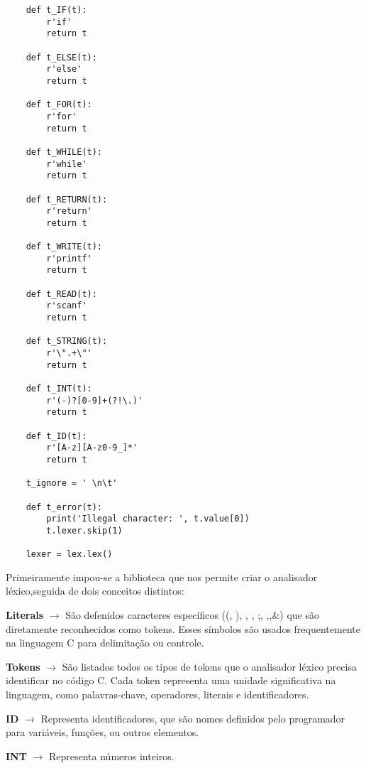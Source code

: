 \documentclass[12pt,a4paper]{report}
\begin{document}
\begin{lstlisting}
    def t_IF(t):
        r'if'
        return t
    
    def t_ELSE(t):
        r'else'
        return t
    
    def t_FOR(t):
        r'for'
        return t
    
    def t_WHILE(t):
        r'while'
        return t
    
    def t_RETURN(t):
        r'return'
        return t
    
    def t_WRITE(t):
        r'printf'
        return t
    
    def t_READ(t):
        r'scanf'
        return t
    
    def t_STRING(t):
        r'\".+\"'
        return t
    
    def t_INT(t):
        r'(-)?[0-9]+(?!\.)'
        return t
    
    def t_ID(t):
        r'[A-z][A-z0-9_]*'
        return t
    
    t_ignore = ' \n\t'
    
    def t_error(t):
        print('Illegal character: ', t.value[0])
        t.lexer.skip(1)
    
    lexer = lex.lex()

\end{lstlisting}

    Primeiramente impou-se a biblioteca que nos permite criar o analisador léxico,seguida de dois conceitos distintos:
    
    \hspace{1cm}
    \textbf{Literals} $\rightarrow$ São defenidos caracteres específicos ((, ), {, }, ;, ,,\&) que são diretamente reconhecidos como tokens. Esses símbolos são usados frequentemente na linguagem C para delimitação ou controle.
    
    \hspace{1cm}
    \textbf{Tokens} $\rightarrow$ São listados todos os tipos de tokens que o analisador léxico precisa identificar no código C. Cada token representa uma unidade significativa na linguagem, como palavras-chave, operadores, literais e identificadores.

    \hspace{3cm}
    \textbf{ID} $\rightarrow$ Representa identificadores, que são nomes definidos pelo programador para variáveis, funções, ou outros elementos.
    
    \hspace{3cm}
    \textbf{INT} $\rightarrow$ Representa números inteiros.
\end{document}
